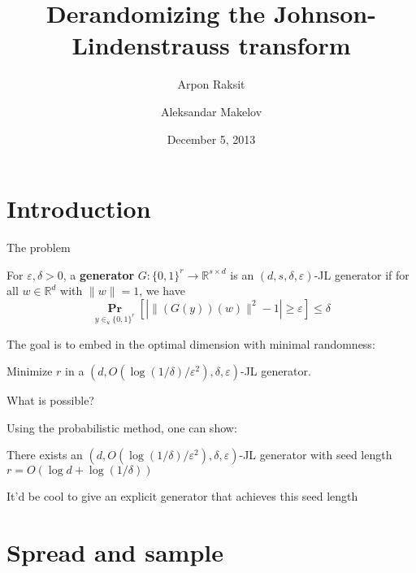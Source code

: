 \documentclass[10pt]{beamer}
\title[Derandomizing JL]{Derandomizing the Johnson-Lindenstrauss
  transform}
\author{Arpon Raksit  \and Aleksandar Makelov}
\date{December 5, 2013}
\newcommand{\R}{\mathbb{R}}
\renewcommand{\P}{\operatorname*{\mathbf{Pr}}}
\renewcommand{\l}{\left}
\renewcommand{\r}{\right}
\newcommand{\eps}{\varepsilon}
\newcommand{\inr}{\in_{u}}
\begin{document}
\begin{frame}
  \titlepage
\end{frame}


\section{Introduction}

\begin{frame}
  \sectionpage
\end{frame}

\begin{frame}{The problem}
  \begin{definition}
    For $\eps,\delta>0$, a \textbf{generator} $G:\{0,1\}^r\to \R^{s\times
      d}$ is an $(d,s,\delta,\eps)$-JL generator if for all $w\in\R^d$
    with $\|w\|=1$, we have
    \[
      \P_{y\inr\{0,1\}^r}\l[| \|(G(y))(w) \|^2 -
        1|\geq\eps\r]\leq\delta
    \]
  \end{definition}

  \pause\bigskip\bigskip

  The goal is to embed in the optimal dimension with minimal
  randomness:

  \begin{problem}
    Minimize $r$ in a $(d,O(\log(1/\delta)/\eps^2),\delta,\eps)$-JL
    generator.
  \end{problem}

\end{frame}

\begin{frame}{What is possible?}

Using the probabilistic method, one can show:
\begin{theorem}
  There exists an $(d,O(\log(1/\delta)/\eps^2),\delta,\eps)$-JL
  generator with seed length $r=O(\log d + \log(1/\delta))$
\end{theorem}

\bigskip\bigskip

It'd be cool to give an explicit generator that achieves this seed
length

\end{frame}



\section{Spread and sample \cite{karnin2011explicit}}
\end{document}
